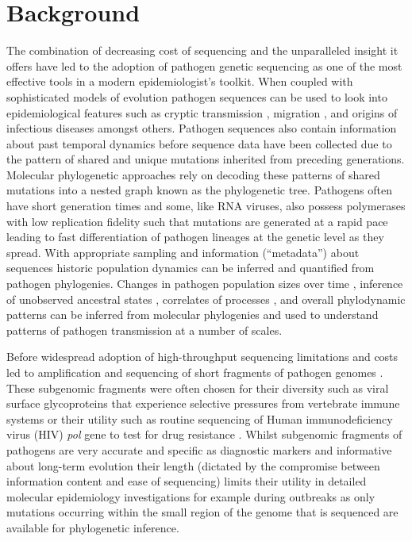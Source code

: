 \documentclass{bmcart}
\begin{document}
%
%
\section*{Background}

The combination of decreasing cost of sequencing and the unparalleled insight it offers have led to the adoption of pathogen genetic sequencing as one of the most effective tools in a modern epidemiologist's toolkit.
When coupled with sophisticated models of evolution pathogen sequences can be used to look into epidemiological features such as cryptic transmission \cite{faria_establishment_2017}, migration \cite{lemey_bayesian_2009,lemey_unifying_2014}, and origins \cite{smith_origins_2009} of infectious diseases amongst others.
Pathogen sequences also contain information about past temporal dynamics before sequence data have been collected \cite{raghwani_origin_2012} due to the pattern of shared and unique mutations inherited from preceding generations.
Molecular phylogenetic approaches rely on decoding these patterns of shared mutations into a nested graph known as the phylogenetic tree.
Pathogens often have short generation times and some, like RNA viruses, also possess polymerases with low replication fidelity such that mutations are generated at a rapid pace \cite{drummond_measurably_2003,biek_measurably_2015} leading to fast differentiation of pathogen lineages at the genetic level as they spread.
With appropriate sampling and information (``metadata'') about sequences historic population dynamics can be inferred and quantified from pathogen phylogenies.
Changes in pathogen population sizes over time \cite{pybus_integrated_2000}, inference of unobserved ancestral states \cite{dudas_mers-cov_2018}, correlates of processes \cite{faria_simultaneously_2013,dudas_virus_2017}, and overall phylodynamic \cite{grenfell_unifying_2004} patterns can be inferred from molecular phylogenies and used to understand patterns of pathogen transmission at a number of scales.

Before widespread adoption of high-throughput sequencing limitations and costs led to amplification and sequencing of short fragments of pathogen genomes \cite{jin_genetic_1999,jin_proposal_2005}.
These subgenomic fragments were often chosen for their diversity such as viral surface glycoproteins that experience selective pressures from vertebrate immune systems or their utility such as routine sequencing of Human immunodeficiency virus (HIV) \textit{pol} gene to test for drug resistance \cite{kaye_phylogenetic_2008,rhee_human_2003}.
Whilst subgenomic fragments of pathogens are very accurate and specific as diagnostic markers and informative about long-term evolution their length (dictated by the compromise between information content and ease of sequencing) limits their utility in detailed molecular epidemiology investigations for example during outbreaks \cite{wohl_co-circulating_2018} as only mutations occurring within the small region of the genome that is sequenced are available for phylogenetic inference.
\end{document}
